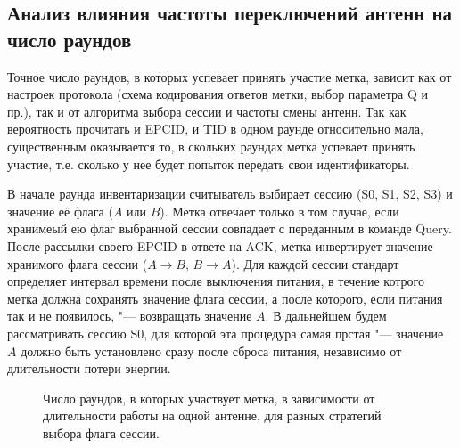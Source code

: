 \subsection{Анализ влияния частоты переключений антенн на число раундов}
Точное число раундов, в которых успевает принять участие метка, зависит как от настроек протокола (схема кодирования ответов метки, выбор параметра Q и пр.), так и от алгоритма выбора сессии и частоты смены антенн. Так как вероятность прочитать и EPCID, и TID в одном раунде относительно мала, существенным оказывается то, в скольких раундах метка успевает принять участие, т.е. сколько у нее будет попыток передать свои идентификаторы.

В начале раунда инвентаризации считыватель выбирает сессию (S0, S1, S2, S3) и значение её флага ($A$ или $B$). Метка отвечает только в том случае, если хранимеый ею флаг выбранной сессии совпадает с переданным в команде Query. После рассылки своего EPCID в ответе на ACK, метка инвертирует значение хранимого флага сессии ($A \rightarrow B,\, B \rightarrow A$). Для каждой сессии стандарт определяет интервал времени после выключения питания, в течение котрого метка должна сохранять значение флага сессии, а после которого, если питания так и не появилось, "--- возвращать значение $A$. В дальнейшем будем рассматривать сессию S0, для которой эта процедура самая прстая "--- значение $A$ должно быть установлено сразу после сброса питания, независимо от длительности потери энергии.

\begin{figure}[h]
	\caption{Число раундов, в которых участвует метка, в зависимости от длительности работы на одной антенне, для разных стратегий выбора флага сессии.}
	\label{fig:ch2_rounds_per_tag}
\end{figure}

